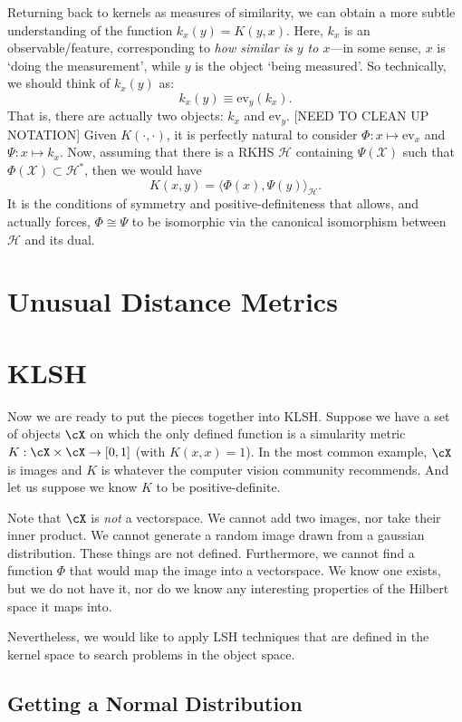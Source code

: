 \documentclass[twoside,11pt]{homework}
\begin{document}
\begin{multicols}{2}
Returning back to kernels as measures of similarity, we can obtain a more subtle understanding of the function $k_x(y) = K(y,x)$. Here, $k_x$ is an observable/feature, corresponding to \emph{how similar is $y$ to $x$}---in some sense, $x$ is `doing the measurement', while $y$ is the object `being measured'. So technically, we should think of $k_x(y)$ as:
\[k_x(y) \equiv \mathrm{ev}_y(k_x).\]
That is, there are actually two objects: $k_x$ and $\mathrm{ev}_y$. [NEED TO CLEAN UP NOTATION] Given $K(\cdot,\cdot)$, it is perfectly natural to consider $\Phi: x \mapsto \mathrm{ev}_x$ and $\Psi: x \mapsto k_x$. Now, assuming that there is a RKHS $\mathcal{H}$ containing $\Psi(\mathcal{X})$ such that $\Phi(\mathcal{X}) \subset \mathcal{H}^*$, then we would have
\[K(x,y) = \langle \Phi(x), \Psi(y)\rangle_\mathcal{H}.\]
It is the conditions of symmetry and positive-definiteness that allows, and actually forces, $\Phi \cong \Psi$ to be isomorphic via the canonical isomorphism between $\mathcal{H}$ and its dual.

\section{Unusual Distance Metrics} %
  
\section{KLSH}

Now we are ready to put the pieces together into KLSH.  Suppose we
have a set of objects $\cX$ on which the only defined function is a
simularity metric $K:\cX \times \cX \rightarrow [0,1]$ (with
$K(x,x)=1$).  In the most
common example, $\cX$ is images and $K$ is whatever the computer
vision community recommends.  And let us suppose we know $K$ to be
positive-definite.

Note that $\cX$ is \emph{not} a vectorspace.  We cannot add two
images, nor take their inner product.  We cannot generate a random
image drawn from a gaussian distribution.  These things are not
defined.  Furthermore, we cannot find a function $\Phi$ that would map
the image into a vectorspace.  We know one exists, but we do not have
it, nor do we know any interesting properties of the Hilbert space it
maps into.

Nevertheless, we would like to apply LSH techniques that are defined
in the kernel space to search problems in the object space.
  
\subsection{Getting a Normal Distribution} %


\end{multicols}
\end{document}
